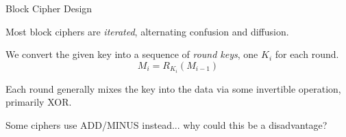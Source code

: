 \documentclass[12pt]{beamer}
\begin{document}
\begin{frame}{Block Cipher Design}
	\begin{block}{}
		Most block ciphers are \textit{iterated}, alternating confusion and
		diffusion.

		We convert the given key into a sequence of \textit{round keys}, one
		$K_i$ for each round.
		\[ M_i = R_{K_i}(M_{i-1}) \]
	\end{block}

	Each round generally mixes the key into the data via some invertible
	operation, primarily XOR.

	Some ciphers use ADD/MINUS instead... why could this be a disadvantage?


\end{frame}
\end{document}
